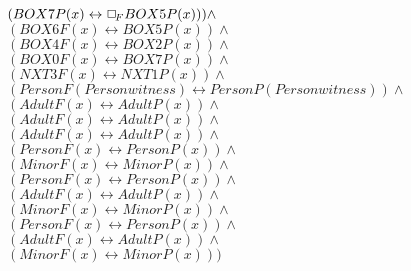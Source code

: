 \documentclass[a4paper,10pt]{article}
\begin{document}
 $ (BOX7P(x) \leftrightarrow  \Box_{\!F} BOX5P(x))) \land $ \\ 
 $ (BOX6F(x) \leftrightarrow BOX5P(x)) \land $ \\ 
 $ (BOX4F(x) \leftrightarrow BOX2P(x)) \land $ \\ 
 $ (BOX0F(x) \leftrightarrow BOX7P(x)) \land $ \\ 
 $ (NXT3F(x) \leftrightarrow NXT1P(x)) \land $ \\ 
 $ (PersonF(Personwitness) \leftrightarrow PersonP(Personwitness)) \land $ \\ 
 $ (AdultF(x) \leftrightarrow AdultP(x)) \land $ \\ 
 $ (AdultF(x) \leftrightarrow AdultP(x)) \land $ \\ 
 $ (AdultF(x) \leftrightarrow AdultP(x)) \land $ \\ 
 $ (PersonF(x) \leftrightarrow PersonP(x)) \land $ \\ 
 $ (MinorF(x) \leftrightarrow MinorP(x)) \land $ \\ 
 $ (PersonF(x) \leftrightarrow PersonP(x)) \land $ \\ 
 $ (AdultF(x) \leftrightarrow AdultP(x)) \land $ \\ 
 $ (MinorF(x) \leftrightarrow MinorP(x)) \land $ \\ 
 $ (PersonF(x) \leftrightarrow PersonP(x)) \land $ \\ 
 $ (AdultF(x) \leftrightarrow AdultP(x)) \land $ \\ 
 $ (MinorF(x) \leftrightarrow MinorP(x)))$ 
\end{document}

